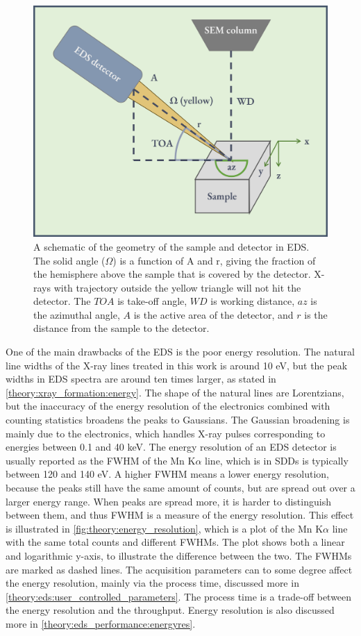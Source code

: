 \begin{figure}[ht]
    \centering
    \includegraphics[width=0.6\linewidth]{figures/EDS_geometry.png}
    \caption{
        A schematic of the geometry of the sample and detector in EDS.
        The solid angle ($\Omega$) is a function of A and r, giving the fraction of the hemisphere above the sample that is covered by the detector.
        X-rays with trajectory outside the yellow triangle will not hit the detector.
        The $TOA$ is take-off angle, $WD$ is working distance, $az$ is the azimuthal angle, $A$ is the active area of the detector, and $r$ is the distance from the sample to the detector.
    }
    \label{fig:eds_geometry}
\end{figure}






One of the main drawbacks of the EDS is the poor energy resolution. %
The natural line widths of the X-ray lines treated in this work is around 10 eV, but the peak widths in EDS spectra are around ten times larger, as stated in \cref{theory:xray_formation:energy}.
The shape of the natural lines are Lorentzians, but the inaccuracy of the energy resolution of the electronics combined with counting statistics broadens the peaks to Gaussians.
The Gaussian broadening is mainly due to the electronics, which handles X-ray pulses corresponding to energies between 0.1 and 40 keV.
The energy resolution of an EDS detector is usually reported as the FWHM of the Mn K$\alpha$ line, which is in SDDs is typically between 120 and 140 eV.
A higher FWHM means a lower energy resolution, because the peaks still have the same amount of counts, but are spread out over a larger energy range.
When peaks are spread more, it is harder to distinguish between them, and thus FWHM is a measure of the energy resolution.
This effect is illustrated in \cref{fig:theory:energy_resolution}, which is a plot of the Mn K$\alpha$ line with the same total counts and different FWHMs.
The plot shows both a linear and logarithmic y-axis, to illustrate the difference between the two.
The FWHMs are marked as dashed lines.
The acquisition parameters can to some degree affect the energy resolution, mainly via the process time, discussed more in \cref{theory:eds:user_controlled_parameters}.
The process time is a trade-off between the energy resolution and the throughput.
Energy resolution is also discussed more in \cref{theory:eds_performance:energyres}.




